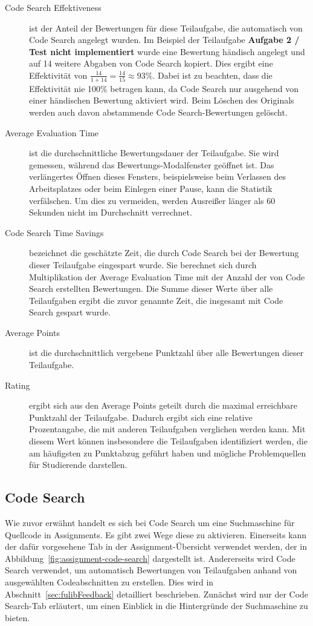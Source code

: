 \begin{description}
    \item[Code Search Effektiveness] ist der Anteil der Bewertungen für diese Teilaufgabe, die automatisch von Code Search angelegt wurden.
    Im Beispiel der Teilaufgabe \textbf{Aufgabe 2 / Test nicht implementiert} wurde eine Bewertung händisch angelegt und auf 14 weitere Abgaben von Code Search kopiert.
    Dies ergibt eine Effektivität von $\frac{14}{1 + 14} = \frac{14}{15} \approx 93\%$.
    Dabei ist zu beachten, dass die Effektivität nie 100\% betragen kann, da Code Search nur ausgehend von einer händischen Bewertung aktiviert wird.
    Beim Löschen des Originals werden auch davon abstammende Code Search-Bewertungen gelöscht.
    \item[Average Evaluation Time] ist die durchschnittliche Bewertungsdauer der Teilaufgabe.
    Sie wird gemessen, während das Bewertungs-Modalfenster geöffnet ist.
    Das verlängertes Öffnen dieses Fensters, beispielsweise beim Verlassen des Arbeitsplatzes oder beim Einlegen einer Pause, kann die Statistik verfälschen.
    Um dies zu vermeiden, werden Ausreißer länger als 60 Sekunden nicht im Durchschnitt verrechnet.
    \item[Code Search Time Savings] bezeichnet die geschätzte Zeit, die durch Code Search bei der Bewertung dieser Teilaufgabe eingespart wurde.
    Sie berechnet sich durch Multiplikation der Average Evaluation Time mit der Anzahl der von Code Search erstellten Bewertungen.
    Die Summe dieser Werte über alle Teilaufgaben ergibt die zuvor genannte Zeit, die insgesamt mit Code Search gespart wurde.
    \item[Average Points] ist die durchschnittlich vergebene Punktzahl über alle Bewertungen dieser Teilaufgabe.
    \item[Rating] ergibt sich aus den Average Points geteilt durch die maximal erreichbare Punktzahl der Teilaufgabe.
    Dadurch ergibt sich eine relative Prozentangabe, die mit anderen Teilaufgaben verglichen werden kann.
    Mit diesem Wert können insbesondere die Teilaufgaben identifiziert werden, die am häufigsten zu Punktabzug geführt haben und mögliche Problemquellen für Studierende darstellen.
\end{description}

\subsection{Code Search}\label{subsec:code-search}

Wie zuvor erwähnt handelt es sich bei Code Search um eine Suchmaschine für Quellcode in Assignments.
Es gibt zwei Wege diese zu aktivieren.
Einerseits kann der dafür vorgesehene Tab in der Assignment-Übersicht verwendet werden, der in Abbildung~\ref{fig:assignment-code-search} dargestellt ist.
Andererseits wird Code Search verwendet, um automatisch Bewertungen von Teilaufgaben anhand von ausgewählten Codeabschnitten zu erstellen.
Dies wird in Abschnitt~\ref{sec:fulibFeedback} detailliert beschrieben.
Zunächst wird nur der Code Search-Tab erläutert, um einen Einblick in die Hintergründe der Suchmaschine zu bieten.

